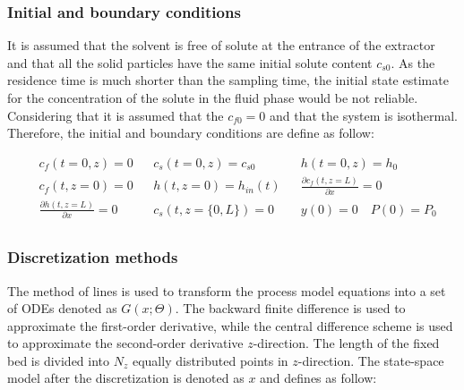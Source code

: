 \documentclass[../Article_Model_Parameters.tex]{subfiles}
\begin{document}
			\subsubsection{Initial and boundary conditions} 
			It is assumed that the solvent is free of solute at the entrance of the extractor and that all the solid particles have the same initial solute content $c_{s0}$. As the residence time is much shorter than the sampling time, the initial state estimate for the concentration of the solute in the fluid phase would be not reliable. Considering that it is assumed that the $c_{f0}=0$ and that the system is isothermal. %
			Therefore, the initial and boundary conditions are define as follow:
			

			
			{\footnotesize
				\begin{align*}
					&c_f(t = 0, z) = 0  && c_s(t = 0, z) = c_{s0} && h(t = 0, z) = h_0 \\
					&c_f(t,   z=0) = 0  && h(t, z=0) = h_{in}(t)  && \frac{\partial c_f(t,z=L)}{\partial x} = 0 \\
					&\frac{\partial h(t,z=L)}{\partial x} = 0   && c_s(t, z=\{0,L\}) = 0 && y(0) = 0 \quad P(0) = P_0 \\
			\end{align*} }
			
			\subsubsection{Discretization methods}
			
			The method of lines is used to transform the process model equations into a set of ODEs denoted as $G(x;\Theta)$. The backward finite difference is used to approximate the first-order derivative, while the central difference scheme is used to approximate the second-order derivative $z$-direction. The length of the fixed bed is divided into $N_z$ equally distributed points in $z$-direction. The state-space model after the discretization is denoted as $x$ and defines as follow:
			
\end{document}

